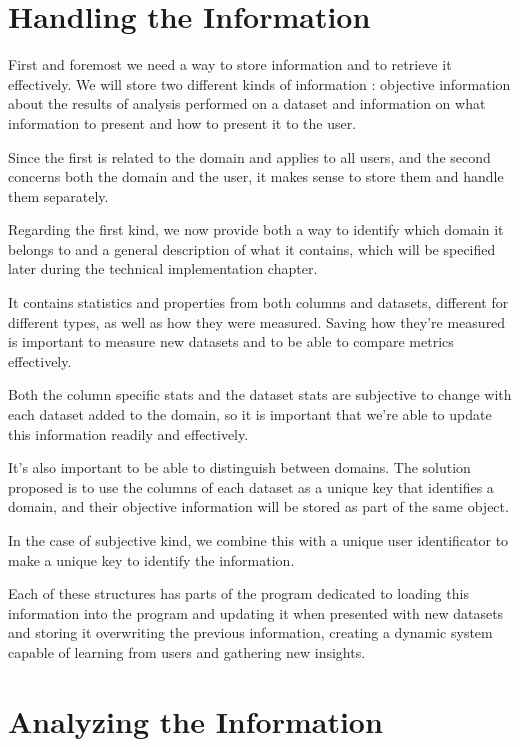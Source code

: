 \section{Handling the Information}
\label{cap2:sec:information}

First and foremost we need a way to store information and to retrieve it effectively. We will store two different kinds of information : objective information about the results of analysis performed on a dataset and information on what information to present and how to present it to the user.

Since the first is related to the domain and applies to all users, and the second concerns both the domain and the user, it makes sense to store them and handle them separately.

Regarding the first kind, we now provide both a way to identify which domain it belongs to and a general description of what it contains, which will be specified later during the technical implementation chapter.

It contains statistics and properties from both columns and datasets, different for different types, as well as how they were measured. Saving how they're measured is important to measure new datasets and to be able to compare metrics effectively.

Both the column specific stats and the dataset stats are subjective to change with each dataset added to the domain, so it is important that we're able to update this information readily and effectively.

It's also important to be able to distinguish between domains. The solution proposed is to use the columns of each dataset as a unique key that identifies a domain, and their objective information will be stored as part of the same object.

In the case of subjective kind, we combine this with a unique user identificator to make a unique key to identify the information.

Each of these structures has parts of the program dedicated to loading this information into the program and updating it when presented with new datasets and storing it overwriting the previous information, creating a dynamic system capable of learning from users and gathering new insights.

\section{Analyzing the Information}
\label{cap2:sec:analysis}

